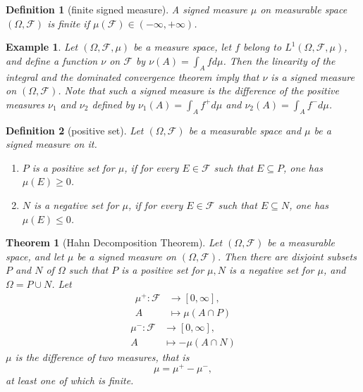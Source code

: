 \documentclass{report}
\newtheorem{definition}{Definition}[section]
\newtheorem{example}{Example}[section]
\newtheorem{theorem}{Theorem}[section]
\theoremstyle{nonumberplain}
\begin{document}
\begin{definition}[finite signed measure]
	A signed measure $\mu$ on measurable space $(\Omega, \mathcal{F})$ is \emph{finite} if $\mu(\mathcal{F})\in(-\infty,+\infty)$.
\end{definition}

\begin{example}
	Let $(\Omega, \mathcal{F}, \mu)$ be a measure space, let $f$ belong to $L^{1}(\Omega, \mathcal{F},\mu)$, and define a function $\nu$ on $\mathcal{F}$ by $\nu(A)=\int_{A} f d \mu$. Then the linearity of the integral and the dominated convergence theorem imply that $\nu$ is a signed measure on $(\Omega, \mathcal{F})$. Note that such a signed measure is the difference of the positive measures $\nu_{1}$ and $\nu_{2}$ defined by $\nu_{1}(A)=\int_{A} f^{+} d \mu$ and $\nu_{2}(A)=\int_{A} f^{-} d \mu$.
\end{example}

\begin{definition}[positive set]
Let $(\Omega, \mathcal{F})$ be a measurable space and $\mu$ be a signed measure on it.
\begin{enumerate}
	\item $P$ is a \emph{positive set} for $\mu$, if for every $E \in \mathcal{F}$ such that $E \subseteq P$, one has $\mu(E) \geq 0$. 
	\item $N$ is a \emph{negative set} for $\mu$, if for every $E \in \mathcal{F}$ such that $E \subseteq N$, one has $\mu(E) \leq 0$. 
\end{enumerate}
\end{definition}

\begin{theorem}[Hahn Decomposition Theorem]
	Let $(\Omega, \mathcal{F})$ be a measurable space, and let $\mu$ be a signed measure on $(\Omega, \mathcal{F}) .$ Then there are disjoint subsets $P$ and $N$ of $\Omega$ such that $P$ is a positive set for $\mu, N$ is a negative set for $\mu$, and $\Omega=P \cup N$. Let
	\begin{align*}
		\mu^+:\mathcal{F}&\longrightarrow [0,\infty],\\
		A &\longmapsto\mu(A\cap P)
	\end{align*}
	\begin{align*}
		\mu^-:\mathcal{F}&\longrightarrow [0,\infty],\\
		A &\longmapsto-\mu(A\cap N)
	\end{align*}
	$\mu$ is the difference of two measures, that is
	\[
	\mu=\mu^+-\mu^-,
	\]
	at least one of which is finite.
\end{theorem} 
\end{document}
